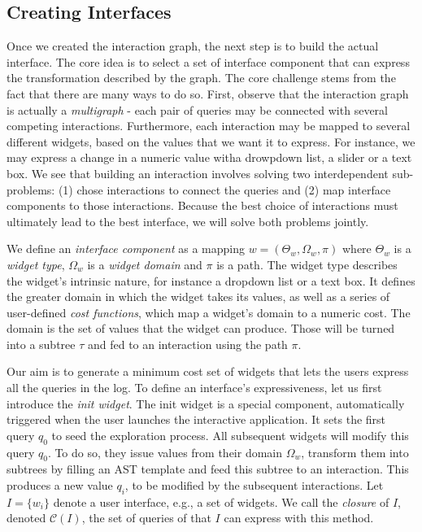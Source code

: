   \subsection{Creating Interfaces}
  Once we created the interaction graph, the next step is to build the actual interface. The core idea is to select a set of interface component that can express the transformation described by the graph. The core challenge stems from the fact that there are many ways to do so. First, observe that the interaction graph is actually a \emph{multigraph} - each pair of queries may be connected with several competing interactions. Furthermore, each interaction may be mapped to several different widgets, based on the values that we want it to express. For instance, we may express a change in a  numeric value witha drowpdown list, a slider or a text box. We see that building an interaction involves solving two interdependent sub-problems: (1) chose interactions to connect the queries and (2) map interface components to those interactions. Because the best choice of interactions must ultimately lead to the best interface, we will solve both problems jointly.

  We define an \emph{interface component} as a mapping $w = (\Theta_w, \Omega_w, \pi)$ where $\Theta_w$ is a \emph{widget type}, $\Omega_w$ is a \emph{widget domain} and $\pi$ is a path. The widget type describes the widget's intrinsic nature, for instance a dropdown list or a text box. It defines the greater domain in which the widget takes its values, as well as a series of user-defined \emph{cost functions}, which map a widget's domain to a numeric cost. The domain is the set of values that the widget can produce. Those will be turned into a subtree $\tau$ and fed to an interaction using the path $\pi$.

  Our aim is to generate a minimum cost set of widgets that lets the users express all the queries in the log. To define an interface's expressiveness, let us first introduce the \emph{init widget}. The init widget is a special component, automatically triggered when the user launches the interactive application. It sets the first query $q_0$ to seed the exploration process. All subsequent widgets will modify this query $q_0$. To do so, they issue values from their domain $\Omega_w$, transform them into subtrees by filling an AST template and feed this subtree to an interaction. This produces a new value $q_i$, to be modified by the subsequent interactions. Let $I = \{w_i\}$ denote a user interface, e.g., a  set of widgets. We call the \emph{closure} of $I$, denoted $\mathcal{C}(I)$, the set of queries of that $I$ can express with this method.

